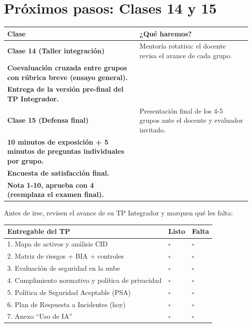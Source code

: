 \documentclass[12pt,a4paper]{article}
\renewcommand{\arraystretch}{1.25}
\newcommand{\checkboxVacio}{$\square$\;}
\begin{document}
\newpage
\section{Pr\'oximos pasos: Clases 14 y 15}

\renewcommand{\arraystretch}{1.6}
\begin{tabularx}{\textwidth}{|>{\bfseries\color{azulUCA}}p{3cm}|X|}
\hline
\rowcolor{grisClaro}
\textbf{Clase} & \textbf{¿Qu\'e haremos?} \\
\hline
\textbf{Clase 14} (Taller integraci\'on) & 
Mentor\'ia rotativa: el docente revisa el avance de cada grupo.\\
Coevaluaci\'on cruzada entre grupos con r\'ubrica breve (ensayo general).\\
Entrega de la versi\'on pre-final del TP Integrador. \\
\hline
\textbf{Clase 15} (Defensa final) & 
Presentaci\'on final de los 4-5 grupos ante el docente y evaluador invitado.\\
10 minutos de exposici\'on + 5 minutos de preguntas individuales por grupo.\\
Encuesta de satisfacci\'on final.\\
\textbf{Nota 1-10, aprueba con 4 (reemplaza el examen final).} \\
\hline
\end{tabularx}

\begin{cajaActividad}[title={Autoevaluaci\'on grupal para llegar a la Clase 14}]
Antes de irse, revisen el avance de su TP Integrador y marquen qu\'e les falta:
\end{cajaActividad}

\vspace{4pt}
\renewcommand{\arraystretch}{1.5}
\begin{tabularx}{\textwidth}{|X|>{\centering\arraybackslash}p{1.5cm}|>{\centering\arraybackslash}p{1.5cm}|}
\hline
\rowcolor{grisClaro}
\textbf{Entregable del TP} & \textbf{Listo} & \textbf{Falta} \\
\hline
1. Mapa de activos y an\'alisis CID & \checkboxVacio & \checkboxVacio \\
\hline
2. Matriz de riesgos + BIA + controles & \checkboxVacio & \checkboxVacio \\
\hline
3. Evaluaci\'on de seguridad en la nube & \checkboxVacio & \checkboxVacio \\
\hline
4. Cumplimiento normativo y pol\'itica de privacidad & \checkboxVacio & \checkboxVacio \\
\hline
5. Pol\'itica de Seguridad Aceptable (PSA) & \checkboxVacio & \checkboxVacio \\
\hline
6. Plan de Respuesta a Incidentes (hoy) & \checkboxVacio & \checkboxVacio \\
\hline
7. Anexo ``Uso de IA'' & \checkboxVacio & \checkboxVacio \\
\hline
\end{tabularx}
\end{document}
